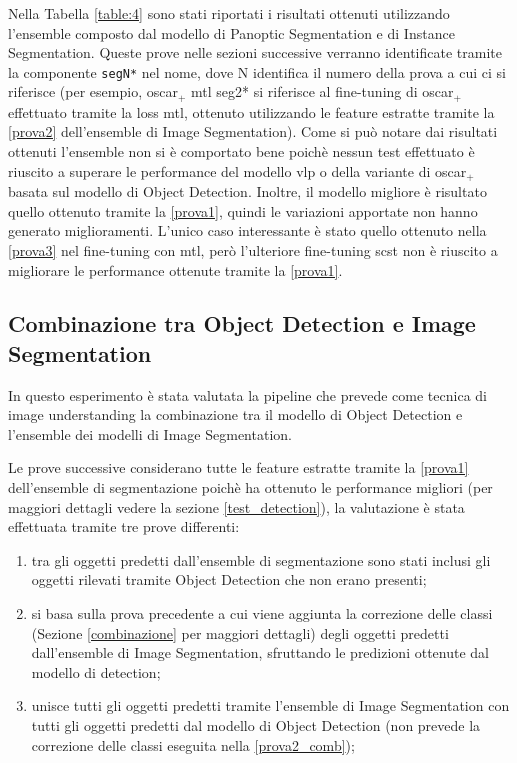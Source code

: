 Nella Tabella \ref{table:4} sono stati riportati i risultati ottenuti utilizzando l'ensemble composto dal modello di Panoptic Segmentation e di Instance Segmentation. 
Queste prove nelle sezioni successive verranno identificate tramite la componente \texttt{segN*} nel nome, dove N identifica il numero della prova a cui ci si riferisce (per esempio, \acrshort{oscar}$_+$ \acrshort{mtl} seg2* si riferisce al fine-tuning di \acrshort{oscar}$_+$ effettuato tramite la loss \acrshort{mtl}, ottenuto utilizzando le feature estratte tramite la \ref{prova2} dell'ensemble di Image Segmentation).
Come si può notare dai risultati ottenuti l'ensemble non si è comportato bene poichè nessun test effettuato è riuscito a superare le performance del modello \acrshort{vlp} o della variante di \acrshort{oscar}$_+$ basata sul modello di Object Detection. Inoltre, il modello migliore è risultato quello ottenuto tramite la \ref{prova1}, quindi le variazioni apportate non hanno generato miglioramenti. L'unico caso interessante è stato quello ottenuto nella \ref{prova3} nel fine-tuning con \acrshort{mtl}, però l'ulteriore fine-tuning \acrshort{scst} non è riuscito a migliorare le performance ottenute tramite la \ref{prova1}.

\subsection{Combinazione tra Object Detection e Image Segmentation}
In questo esperimento è stata valutata la pipeline che prevede come tecnica di image understanding la combinazione tra il modello di Object Detection e l'ensemble dei modelli di Image Segmentation.


Le prove successive considerano tutte le feature estratte tramite la \ref{prova1} dell'ensemble di segmentazione poichè ha ottenuto le performance migliori (per maggiori dettagli vedere la sezione \ref{test_detection}), la valutazione è stata effettuata tramite tre prove differenti:
\begin{enumerate}[leftmargin=1.5cm, label=\textit{Prova \arabic*:}, ref=\textit{Prova \arabic*}]
    \item \label{prova1_comb} tra gli oggetti predetti dall'ensemble di segmentazione sono stati inclusi gli oggetti rilevati tramite Object Detection che non erano presenti;
    \item \label{prova2_comb} si basa sulla prova precedente a cui viene aggiunta la correzione delle classi (Sezione \ref{combinazione} per maggiori dettagli) degli oggetti predetti dall'ensemble di Image Segmentation, sfruttando le predizioni ottenute dal modello di detection;
    \item unisce tutti gli oggetti predetti tramite l'ensemble di Image Segmentation con tutti gli oggetti predetti dal modello di Object Detection (non prevede la correzione delle classi eseguita nella \ref{prova2_comb});
\end{enumerate}

